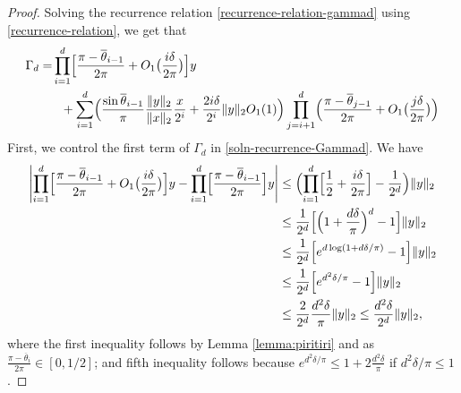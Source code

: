 \documentclass[11pt]{article}
\newcommand{\thetabar}{\overline{\theta}}
\newcommand{\bigPioned}{\prod_{i=1}^d}
\begin{document}
\begin{proof}
Solving the recurrence relation \eqref{recurrence-relation-gammad} using \eqref{recurrence-relation}, we get that
\begin{align}
\Gamma_d = &\bigPioned \Bigl[\frac{\pi - \thetabar_{i-1}}{2\pi} + O_1\bigl(\frac{i \delta}{2 \pi} \bigr) \Bigr] y  \notag \\ & \ \ +
\sum_{i=1}^d  \Bigl( \frac{\sin \thetabar_{i-1}}{ \pi} \frac{\|y\|_2}{\|x\|_2} \frac{x}{2^i} + \frac{2 i \delta}{2^i} \|y\|_2 O_1(1) \Bigr) \prod_{j=i+1}^d \Bigl( \frac{\pi - \thetabar_{j-1}}{2\pi} + O_1\bigl(\frac{j \delta}{2\pi} \bigr)    \Bigr) \label{soln-recurrence-Gammad}
\end{align}
First, we control the first term of $\Gamma_d$ in \eqref{soln-recurrence-Gammad}.  We have
\begin{align}
\left |   \bigPioned \Bigl[\frac{\pi - \thetabar_{i-1}}{2\pi} + O_1 \bigl(\frac{i \delta}{2 \pi} \bigr) \Bigr] y - \bigPioned \Bigl[ \frac{\pi - \thetabar_{i-1}}{2\pi} \Bigr]  y  \right | & \leq \Bigl( \bigPioned \Bigl[\frac{1}{2} + \frac{i \delta}{2\pi}  \Bigr] - \frac{1}{2^d} \Bigr) \|y\|_2 \notag\\
&\leq \frac{1}{2^d} \Bigl[ \Bigl(1 + \frac{d \delta}{\pi} \Bigr)^d - 1  \Bigr] \|y\|_2 \notag \\
&\leq \frac{1}{2^d} \Bigl[ e^{d \log(1+d \delta / \pi)} - 1    \Bigr] \|y\|_2 \notag\\
&\leq \frac{1}{2^d} \Bigl[ e^{d^2 \delta/\pi} - 1    \Bigr] \|y\|_2 \notag\\
&\leq \frac{2}{2^d} \frac{d^2 \delta}{\pi} \|y\|_2 \leq \frac{d^2 \delta}{2^d} \|y\|_2, \label{estimate-gammad-first-term}
\end{align}
where the first inequality follows by Lemma \ref{lemma:piritiri} and as $\frac{\pi - \thetabar_i}{2\pi} \in [0, 1/2]$; and fifth inequality follows because $e^{d^2 \delta / \pi} \leq  1+ 2 \frac{d^2 \delta}{\pi}$ if $d^2 \delta / \pi \leq 1$.


\end{proof}
\end{document}
